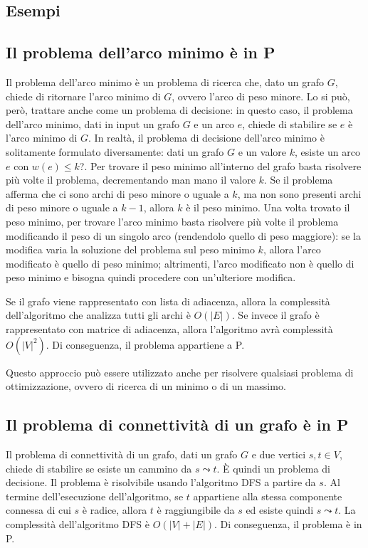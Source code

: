 \subsection{Esempi}
\subsection{Il problema dell'arco minimo è in P}
Il problema dell'arco minimo è un problema di ricerca che, dato un grafo $G$, chiede di ritornare l'arco minimo di $G$, ovvero l'arco di peso minore.
Lo si può, però, trattare anche come un problema di decisione: in questo caso, il problema dell'arco minimo, dati in input un grafo $G$ e un arco $e$, chiede di stabilire se $e$ è l'arco minimo di $G$. 
In realtà, il problema di decisione dell'arco minimo è solitamente formulato diversamente: dati un grafo $G$ e un valore $k$, esiste un arco $e$ con $w(e) \le k$?.
Per trovare il peso minimo all'interno del grafo basta risolvere più volte il problema, decrementando man mano il valore $k$. Se il problema afferma che ci sono archi di peso minore o uguale a $k$, ma non sono presenti archi di peso minore o uguale a $k-1$, allora $k$ è il peso minimo.
Una volta trovato il peso minimo, per trovare l'arco minimo basta risolvere più volte il problema modificando il peso di un singolo arco (rendendolo quello di peso maggiore): se la modifica varia la soluzione del problema sul peso minimo $k$, allora l'arco modificato è quello di peso minimo; altrimenti, l'arco modificato non è quello di peso minimo e bisogna quindi procedere con un'ulteriore modifica.

Se il grafo viene rappresentato con lista di adiacenza, allora la complessità dell'algoritmo che analizza tutti gli archi è $O(|E|)$. Se invece il grafo è rappresentato con matrice di adiacenza, allora l'algoritmo avrà complessità $O(|V|^2)$.
Di conseguenza, il problema appartiene a P.

Questo approccio può essere utilizzato anche per risolvere qualsiasi problema di ottimizzazione, ovvero di ricerca di un minimo o di un massimo.


\subsection{Il problema di connettività di un grafo è in P}
Il problema di connettività di un grafo, dati un grafo $G$ e due vertici $s, t \in V$, chiede di stabilire se esiste un cammino da $s \leadsto t$.
È quindi un problema di decisione.
Il problema è risolvibile usando l'algoritmo DFS a partire da $s$.
Al termine dell'esecuzione dell'algoritmo, se $t$ appartiene alla stessa componente connessa di cui $s$ è radice, allora 
$t$ è raggiungibile da $s$ ed esiste quindi $s \leadsto t$.
La complessità dell'algoritmo DFS è $O(|V| + |E|)$.
Di conseguenza, il problema è in P.


